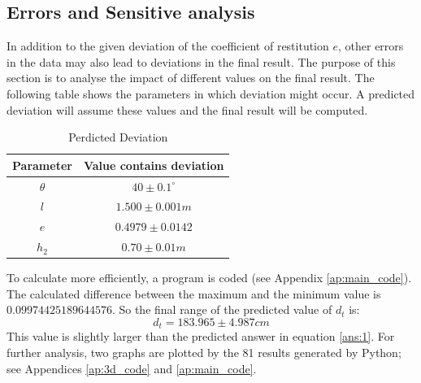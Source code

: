 \documentclass{article}
\begin{document}
    \subsection{Errors and Sensitive analysis}
    In addition to the given deviation of the coefficient of restitution $e$, other errors in the data may also lead to deviations in the final result. The purpose of this section is to analyse the impact of different values on the final result. The following table shows the parameters in which deviation might occur. A predicted deviation will assume these values and the final result will be computed.
    \begin{table}[H]
                \caption {Perdicted Deviation} \label{tb:deviation} 
                \begin{center}
                    \begin{tabular}{cc}
                        \hline
                        Parameter & Value contains deviation \\
                        \hline
                        $\theta$     & $40\pm0.1^ \circ$     \\
                        $l$         & $1.500\pm 0.001m$     \\
                        $e$         & $0.4979 \pm 0.0142$     \\
                        $h_2$        & $0.70\pm0.01m$     \\
                        \hline
                    \end{tabular}
                \end{center}
            \end{table}
    To calculate more efficiently, a program is coded (see Appendix \ref{ap:main_code}).
    The calculated difference between the maximum and the minimum value is $0.09974425189644576$. So the final range of the predicted value of $d_t$ is:
    $$d_t = 183.965\pm4.987cm$$
    This value is slightly larger than the predicted answer in equation \ref{ans:1}. For further analysis, two graphs are plotted by the 81 results generated by Python; see Appendices \ref{ap:3d_code} and \ref{ap:main_code}. 
\end{document}
